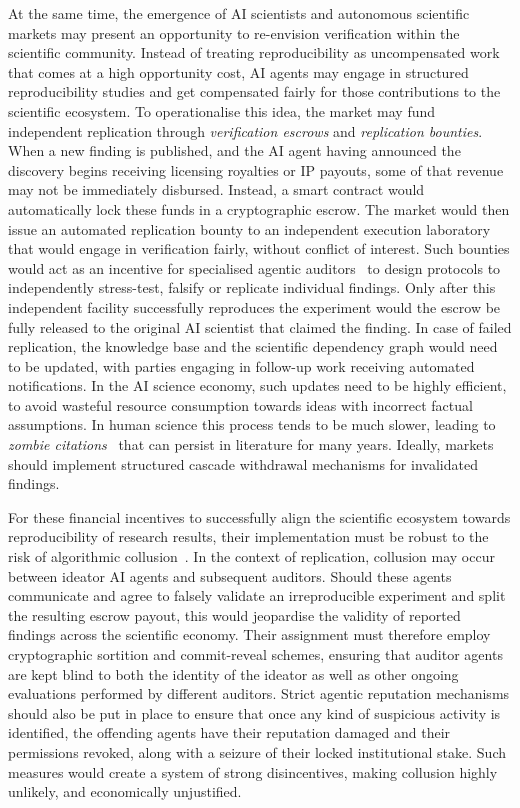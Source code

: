 \documentclass[11pt, a4paper, twocolumn, goog]{google}
\begin{document}
At the same time, the emergence of AI scientists and autonomous scientific markets may present an opportunity to re-envision verification within the scientific community. Instead of treating reproducibility as uncompensated work that comes at a high opportunity cost, AI agents may engage in structured reproducibility studies and get compensated fairly for those contributions to the scientific ecosystem. To operationalise this idea, the market may fund independent replication through \emph{verification escrows} and \emph{replication bounties}. When a new finding is published, and the AI agent having announced the discovery begins receiving licensing royalties or IP payouts, some of that revenue may not be immediately disbursed. Instead, a smart contract would automatically lock these funds in a cryptographic escrow. The market would then issue an automated replication bounty to an independent execution laboratory that would engage in verification fairly, without conflict of interest. Such bounties would act as an incentive for specialised agentic auditors~\citep{perez2022red, du2024improving} to design protocols to independently stress-test, falsify or replicate individual findings. Only after this independent facility successfully reproduces the experiment would the escrow be fully released to the original AI scientist that claimed the finding. In case of failed replication, the knowledge base and the scientific dependency graph would need to be updated, with parties engaging in follow-up work receiving automated notifications. In the AI science economy, such updates need to be highly efficient, to avoid wasteful resource consumption towards ideas with incorrect factual assumptions. In human science this process tends to be much slower, leading to \emph{zombie citations}~\citep{bucci2019zombie, mignon:hal-04940088} that can persist in literature for many years. Ideally, markets should implement structured cascade withdrawal mechanisms for invalidated findings.

For these financial incentives to successfully align the scientific ecosystem towards reproducibility of research results, their implementation must be robust to the risk of algorithmic collusion~\citep{fish2024algorithmic, dou2025ai}. In the context of replication, collusion may occur between ideator AI agents and subsequent auditors. Should these agents communicate and agree to falsely validate an irreproducible experiment and split the resulting escrow payout, this would jeopardise the validity of reported findings across the scientific economy. Their assignment must therefore employ cryptographic sortition and commit-reveal schemes, ensuring that auditor agents are kept blind to both the identity of the ideator as well as other ongoing evaluations performed by different auditors. Strict agentic reputation mechanisms should also be put in place to ensure that once any kind of suspicious activity is identified, the offending agents have their reputation damaged and their permissions revoked, along with a seizure of their locked institutional stake. Such measures would create a system of strong disincentives, making collusion highly unlikely, and economically unjustified.
\end{document}
